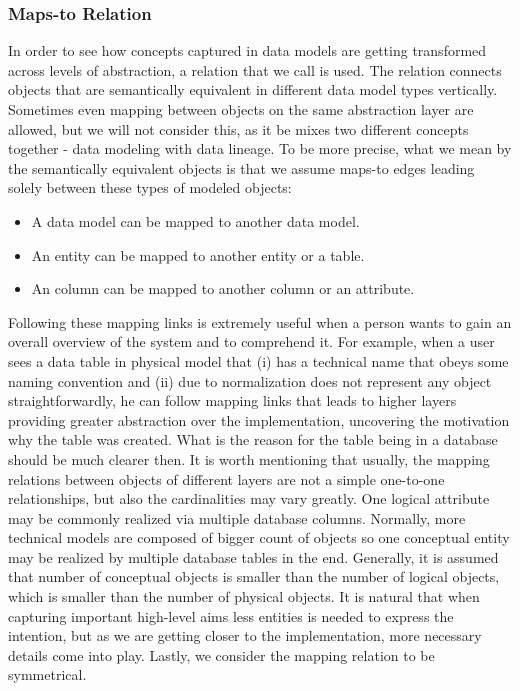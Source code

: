 \subsubsection{Maps-to Relation}

In order to see how concepts captured in data models are getting transformed across levels of abstraction, a relation that we call  is used. The relation connects objects that are semantically equivalent in different data model types vertically.
Sometimes even mapping between objects on the same abstraction layer are allowed, but we will not consider this, as it be mixes two different concepts together - data modeling with data lineage. To be more precise, what we mean by the semantically equivalent objects is that we assume maps-to edges leading solely between these types of modeled objects: 
\begin{itemize}
	\item A data model can be mapped to another data model.
	\item An entity can be mapped to another entity or a table.
	\item An column can be mapped to another column or an attribute.
\end{itemize}
Following these mapping links is extremely useful when a person wants to gain an overall overview of the system and to comprehend it. For example, when a user sees a data table in physical model that (i) has a technical name that obeys some naming convention and (ii) due to normalization does not represent any object straightforwardly, he can follow mapping links that leads to higher layers providing greater abstraction over the implementation, uncovering the motivation why the table was created. What is the reason for the table being in a database should be much clearer then.
It is worth mentioning that usually, the mapping relations between objects of different layers are not a simple one-to-one relationships, but also the cardinalities may vary greatly. One logical attribute may be commonly realized via multiple database columns.
Normally, more technical models are composed of bigger count of objects so one conceptual entity may be realized by multiple database tables in the end. Generally, it is assumed that number of conceptual objects is smaller than the number of logical objects, which is smaller than the number of physical objects. It is natural that when capturing important high-level aims less entities is needed to express the intention, but as we are getting closer to the implementation, more necessary details come into play.
Lastly, we consider the mapping relation to be symmetrical.


